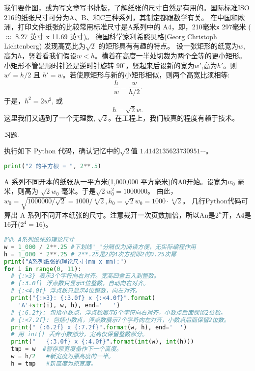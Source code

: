我们要作图，或为写文章写书排版，了解纸张的尺寸自然是有用的。国际标准ISO 216的纸张尺寸可分为A、B、和C三种系列，其制定都跟数学有关。
在中国和欧洲，打印文件纸张的比较常用标准尺寸是A系列中的 A4，即，210毫米\texttt{x}{ }297毫米 ($\approx$ 8.27 英寸 x 11.69 英寸)。
 德国科学家利希滕贝格(Georg Christoph Lichtenberg) 发现高宽比为$\sqrt{2}$
的矩形具有有趣的特点。
设一张矩形的纸宽为$w$,高为$h$，竖着看我们假设$w <h$。横着在高度一半处切裁为两个全等的更小矩形。小矩形不管是顺时针还是逆时针旋转 $90^\circ$，竖起来后设新的宽为$w'$,高为$h'$。则
$w' = h/2$ 且 $h' = w$。若使原矩形与新的小矩形相似，则两个高宽比须相等:
$$\frac{h}{w} = \frac{w}{h/2}.   $$
于是，$h^2= 2 w^2$, 或
 $$h= \sqrt{2} w.$$
这里我们又遇到了一个无理数, $\sqrt{2}$。在工程上，我们较真的程度有赖于技术。
	
\begin{kaishu}习题.\end{kaishu} 执行如下 Python 代码，确认记忆中的$\sqrt{2}$值 $1.4142135623730951\cdots$。
\begin{spacing}{0.8}
	\begin{small}
	\begin{lstlisting}[language=Python]
print("2 的平方根 = ", 2**.5)
\end{lstlisting}
\end{small}
\end{spacing}

A 系列不同开本的纸张从一平方米(1,000,000 平方毫米)的A0开始。设宽为$w_0$ 毫米，则高为
$\sqrt{2}w_0$ 毫米。于是$\sqrt{2}w_0^2 = 1000000$。
由此，
$w_0 = \sqrt{1000000/\sqrt{2}}=1000/\sqrt[4]{2}, 
h_0=\sqrt{2}w_0=1000\cdot\sqrt[4]{2}$。
几行Python代码可算出 A 系列不同开本纸张的尺寸。注意裁开一次页数加倍，所以An是$2^n$开，A4是16开($2^4=16$)。

\vspace{.4cm}
\begin{spacing}{0.8}
	\begin{small}
	\begin{lstlisting}[language=Python]
#%% A系列纸张的理论尺寸
w = 1_000 / 2**.25 #下划线"_"分隔仅为阅读方便，无实际编程作用
h = 1_000 * 2**.25 # 2**.25是2的4次方根即2的0.25次幂 
print("A系列纸张的理论尺寸(mm x mm):")
for i in range(0, 11):
  # {:>3} 表示3个字符向右对齐。宽高四舍五入到整数。
  # {:3.0f} 浮点数只显示3位整数，自动向右对齐。
  # {:<4.0f} 浮点数只显示4位整数，向左对齐。
  print("{:>3}: {:3.0f} x {:<4.0f}".format(
    'A'+str(i), w, h), end='   ')
  # {:6.2f}: 包括小数点，浮点数展示6个字符向右对齐，小数点后面保留2位数。
  # {:<7.2f}: 包括小数点，浮点数展示7个字符向左对齐，小数点后面保留2位数。
  print(" {:6.2f} x {:7.2f}".format(w, h), end='  ')
  # 用 int() 丢弃小数部分，宽高仅保留整数部分。
  print("   {:3.0f} x {:4.0f}".format(int(w), int(h)))
  tmp = w  #暂存原宽度备作下一个高度。
  w = h/2   #新宽度为原高度的一半。
  h = tmp   #新高度为原宽度。
\end{lstlisting}
\end{small}
\end{spacing}
\vspace{.4cm}\label{a_paper_py}

